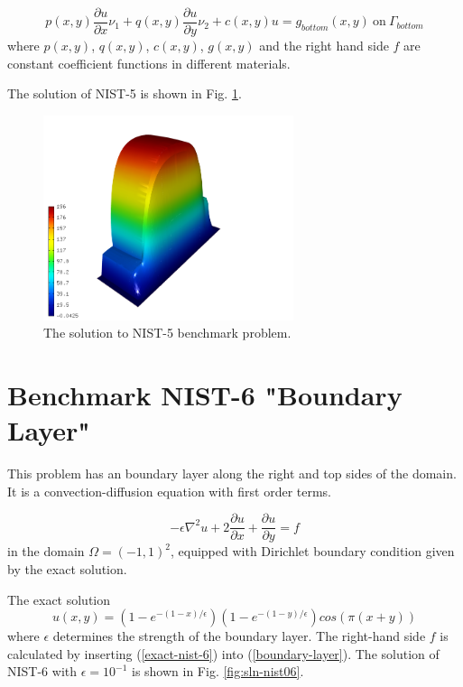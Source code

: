 \documentclass[12pt]{elsarticle}
\begin{document}
\begin{equation}
p(x, y)\frac{\partial u}{\partial x}\nu_1 + q(x, y)\frac{\partial u}{\partial y}\nu_2 + c(x, y)u = g_{bottom}(x, y) \ \mbox{on} \ \Gamma_{bottom}
\end{equation}
where $p(x, y)$, $q(x, y)$, $c(x, y)$, $g(x, y)$
and the right hand side $f$ are constant coefficient
functions in different materials.

The solution of NIST-5 is shown in Fig. \ref{fig:sln-nist05}.
\begin{figure}[!ht]
\centering
\includegraphics[height=6cm]{nist/nist-5/solution-3d.png}
\caption{The solution to NIST-5 benchmark problem.}
\label{fig:sln-nist05}
\end{figure}

\section{Benchmark NIST-6 "Boundary Layer"}
\label{sec:bench-6}

This problem has an boundary layer along the right and top sides of the domain.
It is a convection-diffusion equation with first order terms.

\begin{equation} \label{boundary-layer}
-\epsilon \nabla^{2} u + 2\frac{\partial u}{\partial x} + \frac{\partial u}{\partial y}= f
\end{equation}
in the domain $\Omega = (-1, 1)^2$, equipped with Dirichlet boundary condition
given by the exact solution.

The exact solution
\begin{equation}\label{exact-nist-6}
u(x,y) = (1 - e^{-(1 - x) / \epsilon})(1 - e^{-(1 - y) / \epsilon})cos(\pi (x + y))
\end{equation}
where $\epsilon$ determines the strength of the boundary layer.
The right-hand side $f$ is calculated by inserting (\ref{exact-nist-6}) into (\ref{boundary-layer}).
The solution of NIST-6 with $\epsilon = 10^{-1}$ is shown in Fig. \ref{fig:sln-nist06}.
\end{document}
